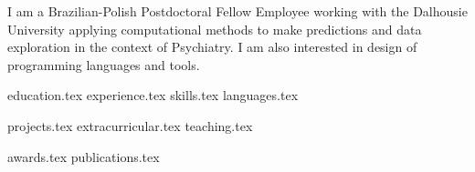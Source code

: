 \documentclass[letterpaper,11pt]{article}
\begin{document}
\newpage


\vspace{0.35cm}
{\justifying
I am a Brazilian-Polish Postdoctoral Fellow Employee working with the Dalhousie University applying computational methods to make predictions and data exploration in the context of Psychiatry.
I am also interested in design of programming languages and tools. %


}

{education.tex}
{experience.tex}
\newpage
\sidebyside
    {{skills.tex}}
    {{languages.tex}}


{projects.tex}
{extracurricular.tex}
{teaching.tex}

{awards.tex}
{publications.tex}
\end{document}
